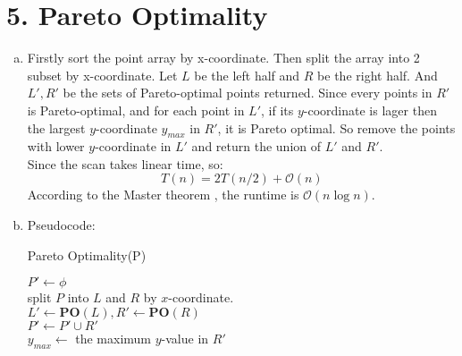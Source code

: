 \documentclass[11pt]{article}
\newenvironment{qparts}{\begin{enumerate}[(a)]}{\end{enumerate}}
\begin{document}
	\section*{5. Pareto Optimality}
	\begin{qparts}
		\item 
		Firstly sort the point array by x-coordinate. Then split the array into 2 subset by x-coordinate. Let $L$ be the left half and $R$ be the right half. And $L', R'$ be the sets of Pareto-optimal points returned. Since every points in $R'$ is Pareto-optimal, and for each point in $L'$, if its $y$-coordinate is lager then the largest $y$-coordinate $y_{max}$ in $R'$, it is Pareto optimal. So remove the points with lower $y$-coordinate in $L'$ and return the union of $L'$ and $R'$. \\
		Since the scan takes linear time, so:
		$$T(n) = 2T(n/2) + \mathcal{O}(n)$$
		According to the Master theorem , the runtime is $\mathcal{O}(n\log n)$.
		\item Pseudocode:\\
		\begin{algorithm}[H]
			\caption{Pareto Optimality(P)}
			$P' \leftarrow \phi$\\
			split $P$ into $L$ and $R$ by $x$-coordinate.\\
			$L' \leftarrow \textbf{PO}(L), R' \leftarrow \textbf{PO}(R)$\\
			$P' \leftarrow P' \cup R'$\\
			$y_{max} \leftarrow$ the maximum $y$-value in $R'$\\
		\end{algorithm}
	\end{qparts}
\end{document}
